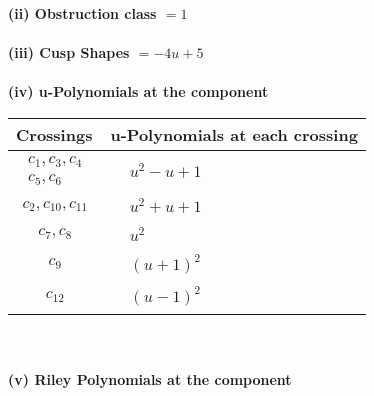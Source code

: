 \documentclass[1p]{elsarticle_modified}
\theoremstyle{definition}
\begin{document}
\flushleft \textbf{(ii) Obstruction class $= 1$}\\~\\
\flushleft \textbf{(iii) Cusp Shapes $= -4 u+5$}\\~\\
\newpage\renewcommand{\arraystretch}{1}
\flushleft \textbf{(iv) u-Polynomials at the component}\newline \\
\begin{tabular}{m{50pt}|m{274pt}}
Crossings & \hspace{64pt}u-Polynomials at each crossing \\
\hline $$\begin{aligned}c_{1},c_{3},c_{4}\\c_{5},c_{6}\end{aligned}$$&$\begin{aligned}
&u^2- u+1
\end{aligned}$\\
\hline $$\begin{aligned}c_{2},c_{10},c_{11}\end{aligned}$$&$\begin{aligned}
&u^2+u+1
\end{aligned}$\\
\hline $$\begin{aligned}c_{7},c_{8}\end{aligned}$$&$\begin{aligned}
&u^2
\end{aligned}$\\
\hline $$\begin{aligned}c_{9}\end{aligned}$$&$\begin{aligned}
&(u+1)^2
\end{aligned}$\\
\hline $$\begin{aligned}c_{12}\end{aligned}$$&$\begin{aligned}
&(u-1)^2
\end{aligned}$\\
\hline
\end{tabular}\\~\\
\newpage\renewcommand{\arraystretch}{1}
\flushleft \textbf{(v) Riley Polynomials at the component}\newline \\
\end{document}
